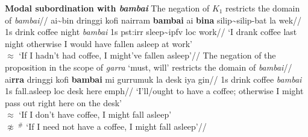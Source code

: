 \pex[interpartskip=2ex,nopreamble=false]\textbf{Modal subordination with \textit{bambai}}
\a\begingl\glpreamble The negation of $ \mathit{K_1} $ restricts the domain of \textit{bambai}//
\gla \nogloss{{[$ _\mathit{{K_1}} $}} ai\textasciitilde{}bin dringgi kofi nairram \nogloss{]} \textbf{bambai} ai \textbf{bina} silip\textasciitilde{}silip-bat la wek//
\glb 1s drink coffee night \textit{bambai} 1s {\sc pst:irr} sleep\textasciitilde\gls{ipfv} {\sc loc} work//
\glft`I drank coffee last night otherwise I would have fallen asleep at work'\\
$ \approx $ `If I hadn't had coffee, I might've fallen asleep'\trailingcitation[AJ 23022017]//
\endgl
\a\begingl\glpreamble The negation of the proposition in the scope of \textit{garra} `must, will' restricts the domain of \textit{bambai}//
\gla \nogloss{{[$ _\mathit{{K_1}} $}} ai\textbf{\textdblhyphen{}rra} dringgi kofi  \nogloss{]} \textbf{bambai} mi gurrumuk la desk iya gin//
\glb 1s drink coffee \textit{bambai} 1s fall.asleep {\sc loc} desk here {\sc emph}//
\glft `I'll/ought to have a coffee; otherwise I might pass out right here on the desk'\trailingcitation{[GT~28052016]}\\
$ \approx $ `If I don't have coffee, I might fall asleep'\\
$ \not\approx\ ^\#\!{} $ `If I need not have a coffee, I might fall asleep'//\endgl


